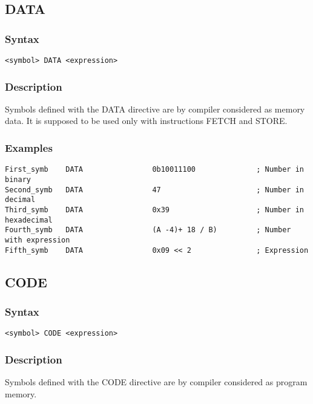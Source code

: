     \subsection{DATA}
        \subsubsection{Syntax}
            \verb'<symbol> DATA <expression>'

        \subsubsection{Description}
            Symbols defined with the DATA directive are by compiler considered as memory data. It is supposed to be used only with instructions FETCH and STORE.

        \subsubsection{Examples}
            \verb'First_symb    DATA                0b10011100              ; Number in binary'\\
            \verb'Second_symb   DATA                47                      ; Number in decimal'\\
            \verb'Third_symb    DATA                0x39                    ; Number in hexadecimal'\\
            \verb'Fourth_symb   DATA                (A -4)+ 18 / B)         ; Number with expression'\\
            \verb'Fifth_symb    DATA                0x09 << 2               ; Expression'

    \subsection{CODE}
        \subsubsection{Syntax}
            \verb'<symbol> CODE <expression>'

        \subsubsection{Description}
            Symbols defined with the CODE directive are by compiler considered as program memory.

